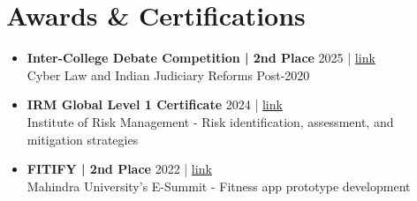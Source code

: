 \documentclass[a4paper,11pt]{article}
\newcommand{\resumeAward}[4]{\item
  \textbf{#1} \hfill #3 | \href{#4}{link} \\
  #2 \vspace{-1mm}
}
\begin{document}
\section{\textbf{Awards \& Certifications}}
\begin{itemize}[leftmargin=*,itemsep=1mm]
\resumeAward{Inter-College Debate Competition | 2nd Place}
{Cyber Law and Indian Judiciary Reforms Post-2020}
{2025}
{https://drive.google.com/file/d/11uASYH2UqavtXNcwyxmgaJoMjOUqwSY0/view?usp=sharing}

\resumeAward{IRM Global Level 1 Certificate}
{Institute of Risk Management - Risk identification, assessment, and mitigation strategies}
{2024}
{https://drive.google.com/file/d/1bQqinD-PEgxwXxF4pJlvSC022TX1KDnj/view?usp=sharing}

\resumeAward{FITIFY | 2nd Place}
{Mahindra University's E-Summit - Fitness app prototype development}
{2022}
{https://drive.google.com/file/d/15pDKqMnI5vn3K-LuLI3v0hInWTLnmQs-/view?usp=sharing}
\end{itemize}
\end{document}
